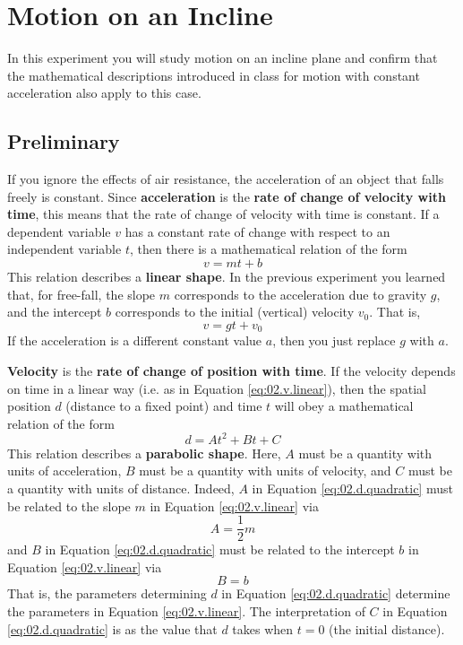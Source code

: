 \setcounter{chapter}{1}
\chapter{Motion on an Incline}
%
In this experiment you will study motion on an incline plane and confirm that the mathematical descriptions introduced in class for motion with constant acceleration also apply to this case.
%
\section{Preliminary}
%
If you ignore the effects of air resistance, the acceleration of an object that falls freely is constant. Since \textbf{acceleration} is the \textbf{rate of change of velocity with time}, this means that the rate of change of velocity with time is constant. If a dependent variable $v$ has a constant rate of change with respect to an independent variable $t$, then there is a mathematical relation of the form
\begin{equation}
    v = m t + b
    \label{eq:02.v.linear}
\end{equation}
This relation describes a \textbf{linear shape}. In the previous experiment you learned that, for free-fall, the slope $m$ corresponds to the acceleration due to gravity $g$, and the intercept $b$ corresponds to the initial (vertical) velocity $v_{0}$. That is,
\begin{equation}
    v = g t + v_{0}
\end{equation}
If the acceleration is a different constant value $a$, then you just replace $g$ with $a$.

\textbf{Velocity} is the \textbf{rate of change of position with time}. If the velocity depends on time in a linear way (i.e. as in Equation \ref{eq:02.v.linear}), then the spatial position $d$ (distance to a fixed point) and time $t$ will obey a mathematical relation of the form
\begin{equation}
    d = A t^{2} + B t + C
    \label{eq:02.d.quadratic}
\end{equation}
This relation describes a \textbf{parabolic shape}. Here, $A$ must be a quantity with units of acceleration, $B$ must be a quantity with units of velocity, and $C$ must be a quantity with units of distance. Indeed, $A$ in Equation \ref{eq:02.d.quadratic} must be related to the slope $m$ in Equation \ref{eq:02.v.linear} via
\begin{equation}
    A = \frac{1}{2} m
\end{equation}
and $B$ in Equation \ref{eq:02.d.quadratic} must be related to the intercept $b$ in Equation \ref{eq:02.v.linear} via
\begin{equation}
    B = b
\end{equation}
That is, the parameters determining $d$ in Equation \ref{eq:02.d.quadratic} determine the parameters in Equation \ref{eq:02.v.linear}. The interpretation of $C$ in Equation \ref{eq:02.d.quadratic} is as the value that $d$ takes when $t = 0$ (the initial distance).

